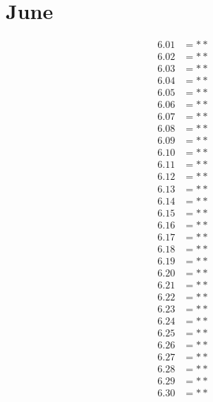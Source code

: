 \documentclass[12pt]{article}
\begin{document}
\section{June}
\begin{align*}
6.01 &= **\\
6.02 &= **\\
6.03 &= **\\
6.04 &= **\\
6.05 &= **\\
6.06 &= **\\
6.07 &= **\\
6.08 &= **\\
6.09 &= **\\
6.10 &= **\\
6.11 &= **\\
6.12 &= **\\
6.13 &= **\\
6.14 &= **\\
6.15 &= **\\
6.16 &= **\\
6.17 &= **\\
6.18 &= **\\
6.19 &= **\\
6.20 &= **\\
6.21 &= **\\
6.22 &= **\\
6.23 &= **\\
6.24 &= **\\
6.25 &= **\\
6.26 &= **\\
6.27 &= **\\
6.28 &= **\\
6.29 &= **\\
6.30 &= **\\
\end{align*}

\pagebreak
 
\end{document}
